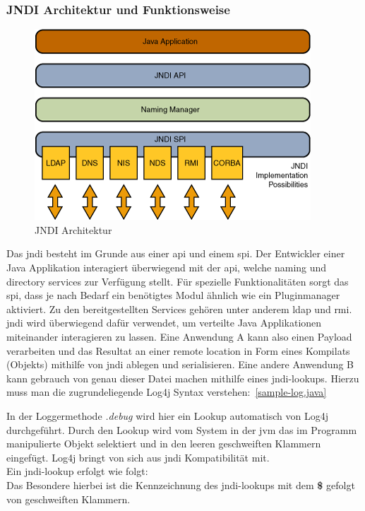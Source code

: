 \subsubsection{JNDI Architektur und Funktionsweise}
\newline
\begin{figure}[!htb] %
    \begin{center}
        \includegraphics[scale=0.75]{images/jndiarch}
    \end{center}
    \caption{JNDI Architektur}
\end{figure}
\newline\newline
Das \gls{jndi} besteht im Grunde aus einer \gls{api} und einem \gls{spi}. Der Entwickler einer Java Applikation interagiert überwiegend mit der \gls{api}, welche
naming und directory services zur Verfügung stellt. Für spezielle Funktionalitäten sorgt das \gls{spi}, dass je nach Bedarf ein benötigtes Modul ähnlich wie ein Pluginmanager
aktiviert. Zu den bereitgestellten Services gehören unter anderem \gls{ldap} und \gls{rmi}. \gls{jndi} wird
überwiegend dafür verwendet, um verteilte Java Applikationen miteinander interagieren zu lassen. Eine Anwendung A kann also einen Payload verarbeiten und
das Resultat an einer remote location in Form eines Kompilats (Objekts) mithilfe von \gls{jndi} ablegen und serialisieren. Eine andere Anwendung B kann gebrauch von genau
dieser Datei machen mithilfe eines \gls{jndi}-lookups.\clearpage
Hierzu muss man die zugrundeliegende Log4j Syntax verstehen:~\ref{sample-log.java}


In der Loggermethode \textit{.debug} wird hier ein Lookup automatisch von Log4j durchgeführt. Durch den Lookup wird vom System in der \gls{jvm} das im Programm
manipulierte Objekt selektiert und in den leeren geschweiften Klammern eingefügt. Log4j bringt von sich aus \gls{jndi} Kompatibilität mit.\\

Ein \gls{jndi}-lookup erfolgt wie folgt:
\\

Das Besondere hierbei ist die Kennzeichnung des \gls{jndi}-lookups mit dem \textbf{\$} gefolgt von geschweiften Klammern.